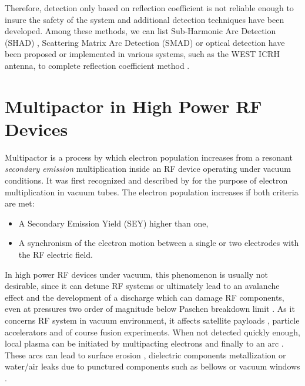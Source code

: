 Therefore, detection only based on reflection coefficient is not reliable enough to insure the safety of the system and additional detection techniques have been developed. Among these methods, we can list Sub-Harmonic Arc Detection (SHAD) , Scattering Matrix Arc Detection (SMAD)  or optical detection have been proposed or implemented in various systems, such as the WEST ICRH antenna, to complete reflection coefficient method . 



\section[Multipactor]{Multipactor in High Power RF Devices}
Multipactor is a process by which electron population increases from a resonant \textit{secondary emission} multiplication inside an RF device operating under vacuum conditions. It was first recognized and described by  for the purpose of electron multiplication in vacuum tubes. The electron population increases if both criteria are met: 
\begin{itemize}
	\item A Secondary Emission Yield (SEY) higher than one,
	\item A synchronism of the electron motion between a single  or two electrodes with the RF electric field.
\end{itemize}

In high power RF devices under vacuum, this phenomenon is usually not desirable, since it can detune RF systems or ultimately lead to an avalanche effect and the development of a discharge which can damage RF components, even at pressures two order of magnitude below Paschen breakdown limit . As it concerns RF system in vacuum environment, it affects satellite payloads , particle accelerators  and of course fusion experiments. When not detected quickly enough, local plasma can be initiated by multipacting electrons and finally to an arc . These arcs can lead to surface erosion , dielectric components metallization  or water/air leaks due to punctured components such as bellows or vacuum windows . 

